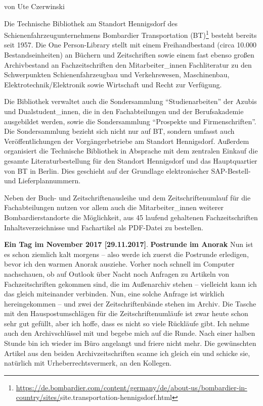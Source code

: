 \documentclass[a4paper,
fontsize=11pt,
oneside,
numbers=noperiodatend,
parskip=half-,
bibliography=totoc,
final
]{scrartcl}
\begin{document}
von Ute Czerwinski

Die Technische Bibliothek am Standort Hennigsdorf des
Schienenfahrzeugunternehmens Bombardier Transportation (BT)\footnote{\url{https://de.bombardier.com/content/germany/de/about-us/bombardier-in-country/sites/}site.transportation-hennigsdorf.html}
besteht bereits seit 1957. Die One Person-Library stellt mit einem
Freihandbestand (circa 10.000 Bestandseinheiten) an Büchern und
Zeitschriften sowie einem fast ebenso großen Archivbestand an
Fachzeitschriften den Mitarbeiter\_innen Fachliteratur zu den
Schwerpunkten Schienenfahrzeugbau und Verkehrswesen, Maschinenbau,
Elektrotechnik/Elektronik sowie Wirtschaft und Recht zur Verfügung.

Die Bibliothek verwaltet auch die Sondersammlung
\enquote{Studienarbeiten} der Azubis und Dualstudent\_innen, die in den
Fachabteilungen und der Berufsakademie ausgebildet werden, sowie die
Sondersammlung \enquote{Prospekte und Firmenschriften}. Die
Sondersammlung bezieht sich nicht nur auf BT, sondern umfasst auch
Veröffentlichungen der Vorgängerbetriebe am Standort Hennigsdorf.
Außerdem organisiert die Technische Bibliothek in Absprache mit dem
zentralen Einkauf die gesamte Literaturbestellung für den Standort
Hennigsdorf und das Hauptquartier von BT in Berlin. Dies geschieht auf
der Grundlage elektronischer SAP-Bestell- und Lieferplannummern.

Neben der Buch- und Zeitschriftenausleihe und dem Zeitschriftenumlauf
für die Fachabteilungen nutzen vor allem auch die Mitarbeiter\_innen
weiterer Bombardierstandorte die Möglichkeit, aus 45 laufend gehaltenen
Fachzeitschriften Inhaltsverzeichnisse und Fachartikel als PDF-Datei zu
bestellen.

\textbf{Ein Tag im November 2017 {[}29.11.2017{]}}. \textbf{Postrunde im
Anorak} Nun ist es schon ziemlich kalt morgens -- also werde ich zuerst
die Postrunde erledigen, bevor ich den warmen Anorak ausziehe. Vorher
noch schnell im Computer nachschauen, ob auf Outlook über Nacht noch
Anfragen zu Artikeln von Fachzeitschriften gekommen sind, die im
Außenarchiv stehen -- vielleicht kann ich das gleich miteinander
verbinden. Nun, eine solche Anfrage ist wirklich hereingekommen -- und
zwei der Zeitschriftenbände stehen im Archiv. Die Tasche mit den
Hauspostumschlägen für die Zeitschriftenumläufe ist zwar heute schon
sehr gut gefüllt, aber ich hoffe, dass es nicht so viele Rückläufe gibt.
Ich nehme auch den Archivschlüssel mit und begebe mich auf die Runde.
Nach einer halben Stunde bin ich wieder im Büro angelangt und friere
nicht mehr. Die gewünschten Artikel aus den beiden Archivzeitschriften
scanne ich gleich ein und schicke sie, natürlich mit
Urheberrechtsvermerk, an den Kollegen.
\end{document}
